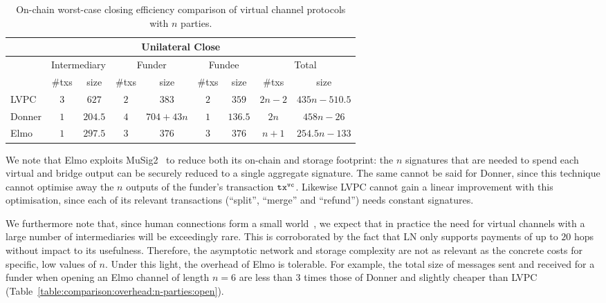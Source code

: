   \addtolength{\intextsep}{-25pt}
  \begin{table}[h!]
    \begin{minipage}{\textwidth}
    \centering
    \begin{tabular}{|l|c|c|c|c|c|c|c|c|}
    \hline
    \multicolumn{9}{|c|}{Unilateral Close} \\
    \hline
              & \multicolumn{2}{|c|}{Intermediary}
              & \multicolumn{2}{|c|}{Funder} & \multicolumn{2}{|c|}{Fundee}
              & \multicolumn{2}{|c|}{Total} \\
    \hline
              & \#txs & size & \#txs & size & \#txs & size & \#txs & size \\
    \hline
    LVPC      & $3$ & $627$ & $2$ & $383$ & $2$ & $359$ & $2n-2$ & $435n -
              510.5$ \\
    \hline
    Donner    & $1$ & $204.5$ & $4$ & $704 + 43n$ & $1$ & $136.5$ & $2n$ & $458n
              - 26$ \\
    \hline
    Elmo      & $1$ & $297.5$ & $3$ & $376$ & $3$ & $376$
              & $n+1$ & $254.5n-133$ \\
    \hline
    \end{tabular}
    \end{minipage}
    \caption{On-chain worst-case closing efficiency comparison of virtual
    channel protocols with $n$ parties.}
    \label{table:comparison:overhead:n-parties:close}
  \end{table}
  \addtolength{\intextsep}{25pt}

  We note that Elmo exploits
  MuSig2~\cite{DBLP:journals/dcc/MaxwellPSW19,DBLP:conf/crypto/NickRS21} to
  reduce both its
  on-chain and storage footprint: the $n$ signatures that are needed to spend
  each virtual and bridge output can be securely reduced to a single aggregate
  signature. The same cannot be said for
  Donner, since this technique cannot optimise away the $n$ outputs of the
  funder's transaction $\texttt{tx}^{\mathtt{vc}}$. Likewise LVPC cannot gain a linear
  improvement with this optimisation, since each of its relevant transactions
  (``split'', ``merge'' and ``refund'') needs constant signatures.

  We furthermore note that, since human connections form a
  small world~\cite{smallworld}, we expect that in practice the
  need for virtual channels with a large number of
  intermediaries will be exceedingly rare. This is corroborated by
  the fact that LN only supports payments of up to $20$ hops
  without impact to its usefulness. Therefore, the asymptotic
  network and storage complexity are not as relevant as the
  concrete costs for specific, low values of $n$. Under this
  light, the overhead of Elmo is tolerable. For example, the
  total size of messages sent and received for a funder when opening an Elmo channel
  of length $n=6$ are less than $3$ times those of Donner and
  slightly cheaper than LVPC
  (Table~\ref{table:comparison:overhead:n-parties:open}).

